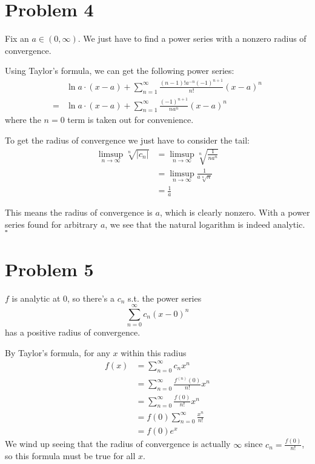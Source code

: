 \documentclass[12pt]{article}
\begin{document}
\setcounter{section}{3}

\section{Problem 4}

Fix an $a \in (0, \infty)$.
We just have to find a power series with a nonzero radius of convergence.

Using Taylor's formula, we can get the following power series:
\begin{align*}
        & \ln a \cdot (x-a) + \sum_{n=1}^{\infty} \frac{(n-1)! a^{-n} (-1)^{n+1}}{n!}(x-a)^n \\
    ={} & \ln a \cdot (x-a) + \sum_{n=1}^{\infty} \frac{(-1)^{n+1}}{n a^n}(x-a)^n
\end{align*}
where the $n=0$ term is taken out for convenience.

To get the radius of convergence we just have to consider the tail:
\begin{align*}
    \limsup_{n \to \infty} \sqrt[n]{|c_n|}
     & = \limsup_{n \to \infty} \sqrt[n]{\frac{1}{n a^n}} \\
     & = \limsup_{n \to \infty} \frac{1}{a\sqrt[n]{n}}    \\
     & = \frac{1}{a}
\end{align*}

This means the radius of convergence is $a$, which is clearly nonzero.
With a power series found for arbitrary $a$, we see that the
natural logarithm is indeed analytic. $\square$

\pagebreak

\section{Problem 5}

$f$ is analytic at $0$, so there's a $c_n$ s.t. the power series
\[\sum_{n=0}^{\infty} c_n(x-0)^n\]
has a positive radius of convergence.

By Taylor's formula, for any $x$ within this radius
\begin{align*}
    f(x)
     & = \sum_{n=0}^{\infty} c_n x^n                   \\
     & = \sum_{n=0}^{\infty} \frac{f^{(n)}(0)}{n!} x^n \\
     & = \sum_{n=0}^{\infty} \frac{f(0)}{n!}x^n        \\
     & = f(0) \sum_{n=0}^{\infty} \frac{x^n}{n!}       \\
     & = f(0) e^x
\end{align*}
We wind up seeing that the radius of convergence is actually $\infty$
since $c_n=\frac{f(0)}{n!}$, so this formula must be true for all $x$.
\end{document}
